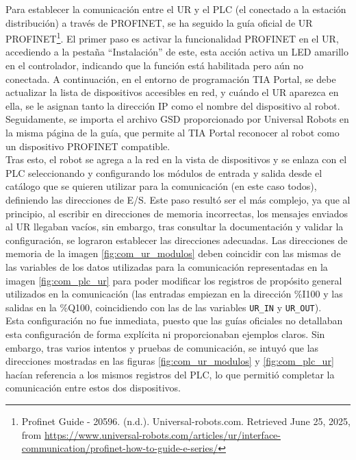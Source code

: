 Para establecer la comunicación entre el UR y el PLC (el conectado a la estación distribución) a través de PROFINET, se ha seguido la guía oficial de UR PROFINET\footnote{Profinet Guide - 20596. (n.d.). Universal-robots.com. Retrieved June 25, 2025, from \url{https://www.universal-robots.com/articles/ur/interface-communication/profinet-how-to-guide-e-series/}}. El primer paso es activar la funcionalidad PROFINET en el UR, accediendo a la pestaña “Instalación” de este, esta acción activa un LED amarillo en el controlador, indicando que la función está habilitada pero aún no conectada. A continuación, en el entorno de programación TIA Portal, se debe actualizar la lista de dispositivos accesibles en red, y cuándo el UR aparezca en ella, se le asignan tanto la dirección IP como el nombre del dispositivo al robot. Seguidamente, se importa el archivo GSD proporcionado por Universal Robots en la misma página de la guía, que permite al TIA Portal reconocer al robot como un dispositivo PROFINET compatible. \\

Tras esto, el robot se agrega a la red en la vista de dispositivos y se enlaza con el PLC seleccionando y configurando los módulos de entrada y salida desde el catálogo que se quieren utilizar para la comunicación (en este caso todos), definiendo las direcciones de E/S. Este paso resultó ser el más complejo, ya que al principio, al escribir en direcciones de memoria incorrectas, los mensajes enviados al UR llegaban vacíos, sin embargo, tras consultar la documentación y validar la configuración, se lograron establecer las direcciones adecuadas. Las direcciones de memoria de la imagen \ref{fig:com_ur_modulos} deben coincidir con las mismas de las variables de los datos utilizadas para la comunicación representadas en la imagen \ref{fig:com_plc_ur} para poder modificar los registros de propósito general utilizados en la comunicación (las entradas empiezan en la dirección \%I100 y las salidas en la \%Q100, coincidiendo con las de las variables \texttt{UR\_IN} y \texttt{UR\_OUT}). \\

Esta configuración no fue inmediata, puesto que las guías oficiales no detallaban esta configuración de forma explícita ni proporcionaban ejemplos claros. Sin embargo, tras varios intentos y pruebas de comunicación, se intuyó que las direcciones mostradas en las figuras \ref{fig:com_ur_modulos} y \ref{fig:com_plc_ur} hacían referencia a los mismos registros del PLC, lo que permitió completar la comunicación entre estos dos dispositivos. \\

